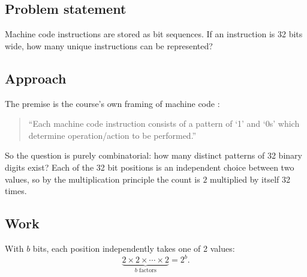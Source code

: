 





\subsection*{Problem statement}

Machine code instructions are stored as bit sequences. If an instruction is 32
bits wide, how many unique instructions can be represented?

\subsection*{Approach}

The premise is the course's own framing of machine code
:

\begin{quote}
``Each machine code instruction consists of a pattern of `1' and `0s' which
determine operation/action to be performed.''
\end{quote}

So the question is purely combinatorial: how many distinct patterns of 32
binary digits exist? Each of the 32 bit positions is an independent choice
between two values, so by the multiplication principle the count is $2$
multiplied by itself 32 times.

\subsection*{Work}

With $b$ bits, each position independently takes one of 2 values:
\begin{equation}
  \underbrace{2 \times 2 \times \cdots \times 2}_{b \text{ factors}} = 2^{b}.
\end{equation}


